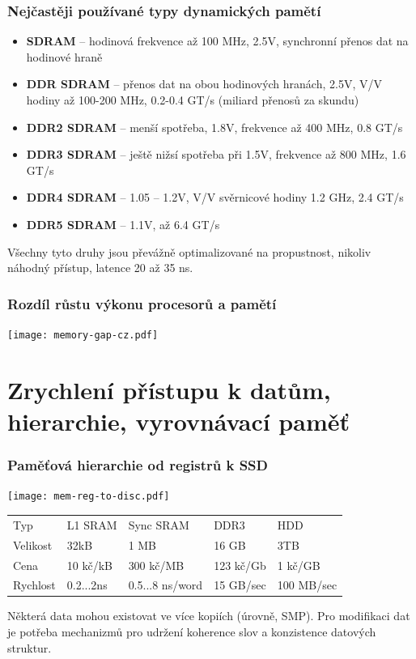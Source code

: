 \documentclass{beamer}
\begin{document}
\begin{frame}
\frametitle{Nejčastěji používané typy dynamických pamětí}

\begin{itemize}
\item \textbf{SDRAM} -- hodinová frekvence až 100 MHz, 2.5V, synchronní přenos dat na hodinové hraně
\item \textbf{DDR SDRAM} -- přenos dat na obou hodinových hranách, 2.5V, V/V hodiny až 100-200 MHz, 0.2-0.4 GT/s (miliard přenosů za skundu)
\item \textbf{DDR2 SDRAM} -- menší spotřeba, 1.8V, frekvence až 400 MHz, 0.8 GT/s
\item \textbf{DDR3 SDRAM} -- ještě nižsí spotřeba při 1.5V, frekvence až 800 MHz, 1.6 GT/s
\item \textbf{DDR4 SDRAM} -- 1.05 -- 1.2V,  V/V svěrnicové hodiny 1.2 GHz, 2.4 GT/s
\item \textbf{DDR5 SDRAM} -- 1.1V, až 6.4 GT/s
\end{itemize}

Všechny tyto druhy jsou převážně optimalizované na propustnost, nikoliv náhodný přístup, latence 20 až 35 ns.

\end{frame}


\begin{frame}
\frametitle{Rozdíl růstu výkonu procesorů a pamětí}

\centering

\texttt{[image: memory-gap-cz.pdf]}

\end{frame}

\section{Zrychlení přístupu k datům, hierarchie, vyrovnávací paměť}

\begin{frame}
\frametitle{Paměťová hierarchie od registrů k SSD}

{
\centering

\texttt{[image: mem-reg-to-disc.pdf]}

}
\vskip 2mm

\begin{tabular}{l|llll}
Typ      & L1 SRAM   & Sync SRAM &  DDR3      & HDD \\
Velikost & 32kB      & 1 MB      &  16 GB     & 3TB \\
Cena     & 10 kč/kB  & 300 kč/MB &  123 kč/Gb & 1 kč/GB \\
Rychlost & 0.2...2ns & 0.5...8 ns/word & 15 GB/sec & 100 MB/sec \\
\end{tabular}

\vskip 2mm

Některá data mohou existovat ve více kopiích (úrovně, SMP).
Pro modifikaci dat je potřeba mechanizmů pro udržení koherence slov a konzistence datových struktur.

\end{frame}
\end{document}
